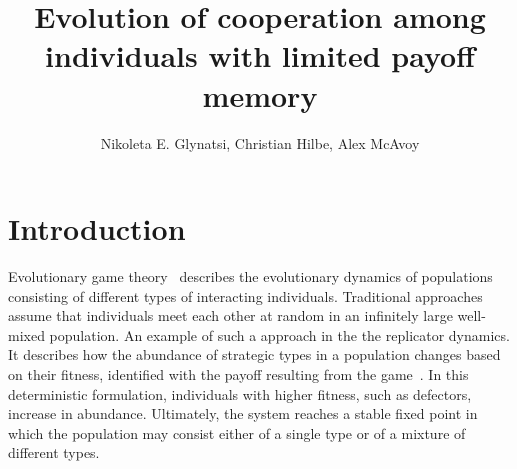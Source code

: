 \documentclass[11pt]{article}
\title{\bf  \sffamily \LARGE Evolution of cooperation among individuals with
limited payoff memory\\}
\date{}
\author{Nikoleta E. Glynatsi, Christian Hilbe, Alex McAvoy}
\theoremstyle{plainCl1}
\theoremstyle{plainCl2}
\begin{document}
\maketitle

\begin{abstract}

\end{abstract}

\section{Introduction}

Evolutionary game theory~\cite{smith1982evolution, hofbauer1998evolutionary,
nowak2004evolutionary, hauert2005game} describes the evolutionary dynamics of
populations consisting of different types of interacting individuals.
Traditional approaches assume that individuals meet each other at random in an
infinitely large well-mixed population. An example of such a approach in the the
replicator dynamics. It describes how the abundance of strategic types in a
population changes based on their fitness, identified with the payoff resulting
from the game~\cite{cressman2014replicator}. In this deterministic formulation,
individuals with higher fitness, such as defectors, increase in abundance.
Ultimately, the system reaches a stable fixed point in which the population may
consist either of a single type or of a mixture of different types.
\end{document}
